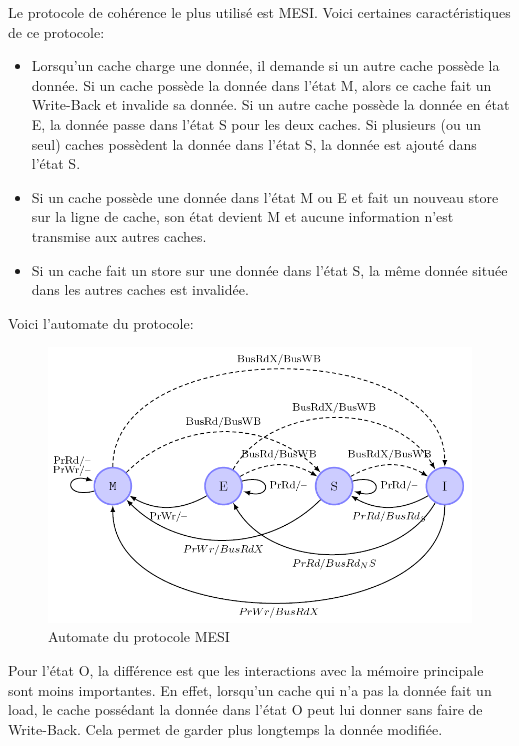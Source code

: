 \documentclass[a4paper]{article}
\begin{document}
\newpage
\indent Le protocole de cohérence le plus utilisé est MESI. Voici certaines caractéristiques de ce protocole: \\
\begin{itemize}
\item Lorsqu'un cache charge une donnée, il demande si un autre cache possède la donnée. Si un cache possède la donnée dans l'état M, alors ce cache fait un Write-Back et invalide sa donnée. Si un autre cache possède la donnée en état E, la donnée passe dans l'état S pour les deux caches. Si plusieurs (ou un seul) caches possèdent la donnée dans l'état S, la donnée est ajouté dans l'état S.
\item Si un cache possède une donnée dans l'état M ou E et fait un nouveau store sur la ligne de cache, son état devient M et aucune information n'est transmise aux autres caches.
\item Si un cache fait un store sur une donnée dans l'état S, la même donnée située dans les autres caches est invalidée. \\
\end{itemize}

\indent Voici l'automate du protocole: \\

\begin{figure}[!h]
\begin{center}
   \includegraphics[scale=0.45]{mesi.png}
   \caption{\label{mesi} Automate du protocole MESI}
\end{center}
\end{figure}

\indent Pour l'état O, la différence est que les interactions avec la mémoire principale sont moins importantes. En effet, lorsqu'un cache qui n'a pas la donnée fait un load, le cache possédant la donnée dans l'état O peut lui donner sans faire de Write-Back. Cela permet de garder plus longtemps la donnée modifiée.
\end{document}
